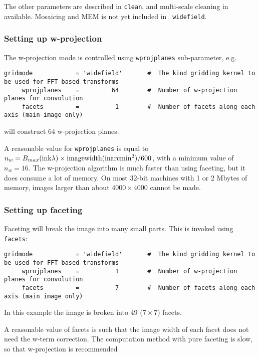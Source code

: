 The other parameters are described in {\tt clean}, and multi-scale
cleaning in available.  Mosaicing and MEM is not yet included in {\tt
widefield}.

\subsubsection{Setting up w-projection}
\label{section:im.clean.widefield.wproj}

The w-projection mode is controlled using {\tt wprojplanes}
sub-parameter, e.g. 
\small
\begin{verbatim}
gridmode            = 'widefield'       #  The kind gridding kernel to be used for FFT-based transforms
     wprojplanes    =         64        #  Number of w-projection planes for convolution
     facets         =          1        #  Number of facets along each axis (main image only)
\end{verbatim}
\normalsize
will construct 64 w-projection planes.

A reasonable value for {\tt wprojplanes} is equal to $n_w = B_{max}({\rm in k}\lambda)
\times {\rm imagewidth}({\rm in arcmin}^2) / 600$, with a minimum value of $n_w=16$.  The
w-projection algorithm is much faster than using faceting, but it does
consume a lot of memory.  On most 32-bit machines with 1 or 2 Mbytes
of memory, images larger than about $4000\times 4000$ cannot be made.

\subsubsection{Setting up faceting}
\label{section:im.clean.widefieldfacet}

Faceting will break the image into many small parts.  This
is invoked using {\tt facets}:
\small
\begin{verbatim}
gridmode            = 'widefield'       #  The kind gridding kernel to be used for FFT-based transforms
     wprojplanes    =          1        #  Number of w-projection planes for convolution
     facets         =          7        #  Number of facets along each axis (main image only)
\end{verbatim}
\normalsize
In this example the image is broken into 49 ($7\times7$) facets.

A reasonable value of facets is such that the image width of each facet
does not need the w-term correction.  The computation method with pure
faceting is slow, so that w-projection is recommended

